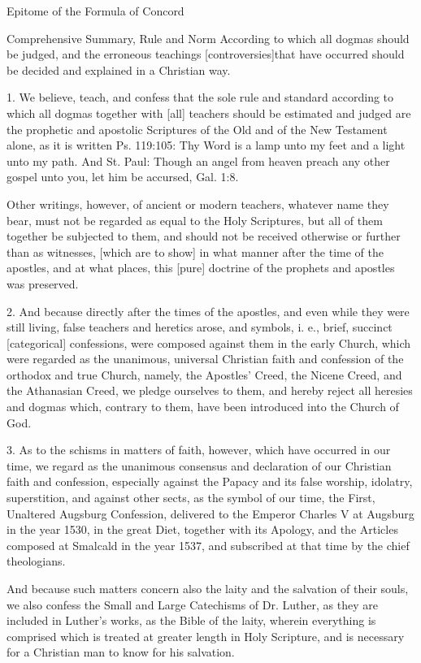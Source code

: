 Epitome of the Formula of Concord

Comprehensive Summary, Rule and Norm According to which all dogmas should be judged, and the erroneous teachings [controversies]that have occurred should be decided and explained in a Christian way.

1. We believe, teach, and confess that the sole rule and standard according to which all dogmas together with [all] teachers should be estimated and judged are the prophetic and apostolic Scriptures of the Old and of the New Testament alone, as it is written Ps. 119:105: Thy Word is a lamp unto my feet and a light unto my path. And St. Paul: Though an angel from heaven preach any other gospel unto you, let him be accursed, Gal. 1:8.

Other writings, however, of ancient or modern teachers, whatever name they bear, must not be regarded as equal to the Holy Scriptures, but all of them together be subjected to them, and should not be received otherwise or further than as witnesses, [which are to show] in what manner after the time of the apostles, and at what places, this [pure] doctrine of the prophets and apostles was preserved.

2. And because directly after the times of the apostles, and even while they were still living, false teachers and heretics arose, and symbols, i. e., brief, succinct [categorical] confessions, were composed against them in the early Church, which were regarded as the unanimous, universal Christian faith and confession of the orthodox and true Church, namely, the Apostles' Creed, the Nicene Creed, and the Athanasian Creed, we pledge ourselves to them, and hereby reject all heresies and dogmas which, contrary to them, have been introduced into the Church of God.

3. As to the schisms in matters of faith, however, which have occurred in our time, we regard as the unanimous consensus and declaration of our Christian faith and confession, especially against the Papacy and its false worship, idolatry, superstition, and against other sects, as the symbol of our time, the First, Unaltered Augsburg Confession, delivered to the Emperor Charles V at Augsburg in the year 1530, in the great Diet, together with its Apology, and the Articles composed at Smalcald in the year 1537, and subscribed at that time by the chief theologians.

And because such matters concern also the laity and the salvation of their souls, we also confess the Small and Large Catechisms of Dr. Luther, as they are included in Luther's works, as the Bible of the laity, wherein everything is comprised which is treated at greater length in Holy Scripture, and is necessary for a Christian man to know for his salvation.

